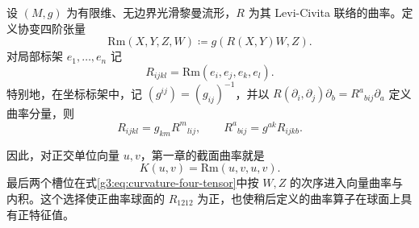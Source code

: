 \begin{definition}\label{g3:def:curvature-four-tensor}
	设 \((M,g)\) 为有限维、无边界光滑黎曼流形，\(R\) 为其 Levi-Civita 联络的曲率。定义协变四阶张量
	\begin{equation}\label{g3:eq:curvature-four-tensor}
		\mathrm{Rm}(X,Y,Z,W)\coloneqq g(R(X,Y)W,Z).
	\end{equation}
	对局部标架 \(e_1,\ldots,e_n\) 记
	\[
		R_{ijkl}=\mathrm{Rm}(e_i,e_j,e_k,e_l).
	\]
	特别地，在坐标标架中，记 \((g^{ij})=(g_{ij})^{-1}\)，并以 \(R(\partial_i,\partial_j)\partial_b=R^a{}_{b i j}\partial_a\) 定义曲率分量，则
	\begin{equation}\label{g3:eq:curvature-lowered-components}
		R_{ijkl}=g_{km}R^m{}_{l i j},\qquad
		R^a{}_{b i j}=g^{ak}R_{ijkb}.
	\end{equation}
\end{definition}

因此，对正交单位向量 \(u,v\)，第一章的截面曲率就是
\[
	K(u,v)=\mathrm{Rm}(u,v,u,v).
\]
最后两个槽位在式\eqref{g3:eq:curvature-four-tensor}中按 \(W,Z\) 的次序进入向量曲率与内积。这个选择使正曲率球面的 \(R_{1212}\) 为正，也使稍后定义的曲率算子在球面上具有正特征值。

